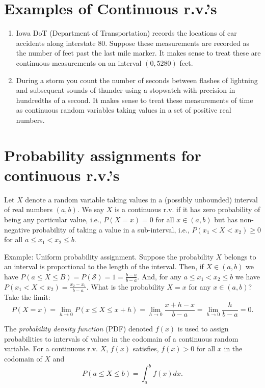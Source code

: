 \documentclass[]{book}
\begin{document}
\section{Examples of Continuous
r.v.'s}\label{examples-of-continuous-r.v.s}

\begin{enumerate}
\def\labelenumi{\arabic{enumi}.}
\item
  Iowa DoT (Department of Transportation) records the locations of car
  accidents along interstate 80. Suppose these measurements are recorded
  as the number of feet past the last mile marker. It makes sense to
  treat these are continuous measurements on an interval \((0,5280)\)
  feet. 
\item
  During a storm you count the number of seconds between flashes of
  lightning and subsequent sounds of thunder using a stopwatch with
  precision in hundredths of a second. It makes sense to treat these
  measurements of time as continuous random variables taking values in a
  set of positive real numbers.
\end{enumerate}

\section{Probability assignments for continuous
r.v.'s}\label{probability-assignments-for-continuous-r.v.s}

Let \(X\) denote a random variable taking values in a (possibly
unbounded) interval of real numbers \((a,b)\). We say \(X\) is a
continuous r.v. if it has zero probability of being any particular
value, i.e., \(P(X=x) = 0\) for all \(x \in (a,b)\) but has non-negative
probability of taking a value in a sub-interval, i.e.,
\(P(x_1 < X <x_2) \geq 0\) for all \(a\leq x_1 < x_2\leq b\).

Example: Uniform probability assignment. Suppose the probability \(X\)
belongs to an interval is proportional to the length of the interval.
Then, if \(X \in (a,b)\) we have
\(P(a \leq X \leq B) = P(\mathcal{S}) = 1 = \frac{b-a}{b-a}\). And, for
any \(a\leq x_1 < x_2\leq b\) we have
\(P(x_1 < X < x_2) = \frac{x_2 - x_1}{b-a}\). What is the probability
\(X = x\) for any \(x \in (a,b)\)? Take the limit:
\[P(X = x) = \lim_{h\rightarrow 0} P(x \leq X \leq x+h) = \lim_{h\rightarrow 0}\frac{x+h - x}{b-a} = \lim_{h\rightarrow 0}\frac{h}{b-a} = 0.\]

The \emph{probability density function} (PDF) denoted \(f(x)\) is used
to assign probabilities to intervals of values in the codomain of a
continuous random variable. For a continuous r.v. \(X\), \(f(x)\)
satisfies, \(f(x)>0\) for all \(x\) in the codomain of \(X\) and
\[P(a\leq X\leq b) = \int_a^b f(x)dx.\]
\end{document}
